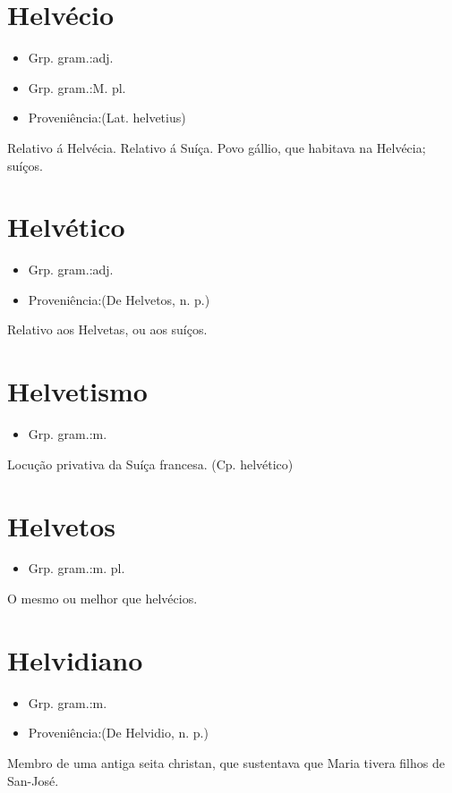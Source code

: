 \documentclass{article}
\begin{document}
\section{Helvécio}
\begin{itemize}
\item {Grp. gram.:adj.}
\end{itemize}
\begin{itemize}
\item {Grp. gram.:M. pl.}
\end{itemize}
\begin{itemize}
\item {Proveniência:(Lat. \textunderscore helvetius\textunderscore )}
\end{itemize}
Relativo á Helvécia.
Relativo á Suíça.
Povo gállio, que habitava na Helvécia; suíços.
\section{Helvético}
\begin{itemize}
\item {Grp. gram.:adj.}
\end{itemize}
\begin{itemize}
\item {Proveniência:(De \textunderscore Helvetos\textunderscore , n. p.)}
\end{itemize}
Relativo aos Helvetas, ou aos suíços.
\section{Helvetismo}
\begin{itemize}
\item {Grp. gram.:m.}
\end{itemize}
Locução privativa da Suíça francesa.
(Cp. \textunderscore helvético\textunderscore )
\section{Helvetos}
\begin{itemize}
\item {Grp. gram.:m. pl.}
\end{itemize}
O mesmo ou melhor que \textunderscore helvécios\textunderscore .
\section{Helvidiano}
\begin{itemize}
\item {Grp. gram.:m.}
\end{itemize}
\begin{itemize}
\item {Proveniência:(De \textunderscore Helvidio\textunderscore , n. p.)}
\end{itemize}
Membro de uma antiga seita christan, que sustentava que Maria tivera filhos de San-José.
\end{document}
